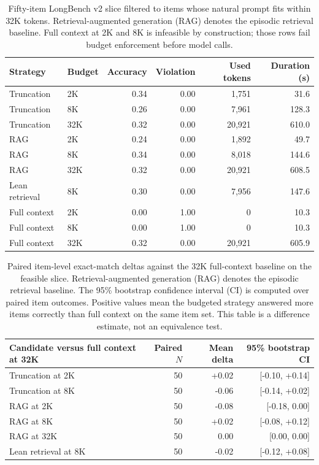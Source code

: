 \documentclass[11pt]{article}
\begin{document}
\begin{table}[t]
\centering
\small
\begin{tabular}{llrrrr}
\toprule
Strategy & Budget & Accuracy & Violation & Used tokens & Duration (s) \\
\midrule
Truncation & 2K & 0.34 & 0.00 & 1,751 & 31.6 \\
Truncation & 8K & 0.26 & 0.00 & 7,961 & 128.3 \\
Truncation & 32K & 0.32 & 0.00 & 20,921 & 610.0 \\
RAG & 2K & 0.24 & 0.00 & 1,892 & 49.7 \\
RAG & 8K & 0.34 & 0.00 & 8,018 & 144.6 \\
RAG & 32K & 0.32 & 0.00 & 20,921 & 608.5 \\
Lean retrieval & 8K & 0.30 & 0.00 & 7,956 & 147.6 \\
Full context & 2K & 0.00 & 1.00 & 0 & 10.3 \\
Full context & 8K & 0.00 & 1.00 & 0 & 10.3 \\
Full context & 32K & 0.32 & 0.00 & 20,921 & 605.9 \\
\bottomrule
\end{tabular}
\caption{Fifty-item LongBench v2 slice filtered to items whose natural prompt fits within 32K tokens.  Retrieval-augmented generation (RAG) denotes the episodic retrieval baseline.  Full context at 2K and 8K is infeasible by construction; those rows fail budget enforcement before model calls.}
\label{tab:full_context_feasible_slice}
\end{table}

\begin{table}[t]
\centering
\small
\begin{tabular}{lrrr}
\toprule
Candidate versus full context at 32K & Paired $N$ & Mean delta & 95\% bootstrap CI \\
\midrule
Truncation at 2K & 50 & +0.02 & [-0.10, +0.14] \\
Truncation at 8K & 50 & -0.06 & [-0.14, +0.02] \\
RAG at 2K & 50 & -0.08 & [-0.18, 0.00] \\
RAG at 8K & 50 & +0.02 & [-0.08, +0.12] \\
RAG at 32K & 50 & 0.00 & [0.00, 0.00] \\
Lean retrieval at 8K & 50 & -0.02 & [-0.12, +0.08] \\
\bottomrule
\end{tabular}
\caption{Paired item-level exact-match deltas against the 32K full-context baseline on the feasible slice.  Retrieval-augmented generation (RAG) denotes the episodic retrieval baseline.  The 95\% bootstrap confidence interval (CI) is computed over paired item outcomes.  Positive values mean the budgeted strategy answered more items correctly than full context on the same item set.  This table is a difference estimate, not an equivalence test.}
\label{tab:paired_full_context_deltas}
\end{table}
\end{document}
